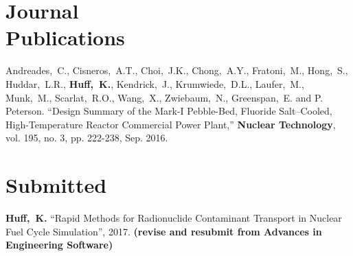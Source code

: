 \documentclass[margin,line]{resume}
\newcommand{\Cyclus}{\textsc{Cyclus}\xspace}%
\begin{document}
\begin{resume}
    \section{\mysidestyle Journal\\Publications}
      \begin{bibenum}
      \item Andreades,~C., Cisneros,~A.T., Choi,~J.K., Chong,~A.Y., 
              Fratoni,~M., Hong,~S., Huddar,~L.R., \textbf{Huff,~K.}, Kendrick,~J., 
              Krumwiede,~D.L., Laufer,~M., Munk,~M., Scarlat,~R.O., Wang,~X., 
              Zwiebaum,~N., Greenspan,~E. and P. Peterson.  ``Design Summary of 
              the Mark-I Pebble-Bed, Fluoride Salt–Cooled, High-Temperature 
              Reactor Commercial Power Plant,'' \textbf{Nuclear Technology}, vol. 195, 
              no. 3, pp. 222-238, Sep. 2016.
      \end{bibenum}
    \section{\mysidestyle Submitted}
      \begin{bibenum}
       \item \textbf{Huff,~K.} ``Rapid Methods for Radionuclide Contaminant
       Transport in Nuclear Fuel Cycle Simulation'', 2017. \textbf{(revise and 
              resubmit from Advances in Engineering Software)}
      \end{bibenum}

\end{resume}
\end{document}
